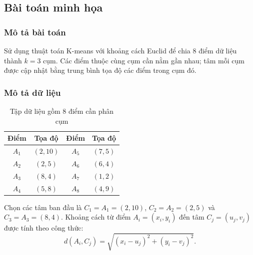 \subsection{Bài toán minh họa}
\subsubsection*{Mô tả bài toán}
Sử dụng thuật toán K-means với khoảng cách Euclid để chia 8 điểm dữ liệu thành $k=3$ cụm. Các điểm thuộc cùng cụm cần nằm gần nhau; tâm mỗi cụm được cập nhật bằng trung bình tọa độ các điểm trong cụm đó.

\subsubsection*{Mô tả dữ liệu}
\begin{table}[H]
    \centering
    \begin{tabular}{|c|c|c|c|}
        \hline
        \textbf{Điểm} & \textbf{Tọa độ} & \textbf{Điểm} & \textbf{Tọa độ} \\
        \hline
        $A_1$ & $(2,10)$ & $A_5$ & $(7,5)$ \\ \hline
        $A_2$ & $(2,5)$ & $A_6$ & $(6,4)$ \\ \hline
        $A_3$ & $(8,4)$ & $A_7$ & $(1,2)$ \\ \hline
        $A_4$ & $(5,8)$ & $A_8$ & $(4,9)$ \\ \hline
    \end{tabular}
    \caption{Tập dữ liệu gồm 8 điểm cần phân cụm}
    \label{tab:kmeans-data}
\end{table}

Chọn các tâm ban đầu là $C_1=A_1=(2,10)$, $C_2=A_2=(2,5)$ và $C_3=A_3=(8,4)$. Khoảng cách từ điểm $A_i=(x_i,y_i)$ đến tâm $C_j=(u_j,v_j)$ được tính theo công thức:
\[
d(A_i,C_j)=\sqrt{(x_i-u_j)^2+(y_i-v_j)^2}.
\]

